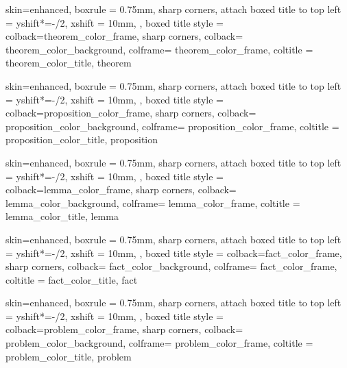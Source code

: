 
{
  skin=enhanced,
  boxrule = 0.75mm,
  sharp corners,
  attach boxed title to top left = {
      yshift*=-\tcboxedtitleheight/2,
      xshift = 10mm,
    },
  boxed title style = {colback=theorem_color_frame, sharp corners},
  colback= theorem_color_background,
  colframe= theorem_color_frame,
  coltitle = theorem_color_title,
}{theorem}

{
  skin=enhanced,
  boxrule = 0.75mm,
  sharp corners,
  attach boxed title to top left = {
      yshift*=-\tcboxedtitleheight/2,
      xshift = 10mm,
    },
  boxed title style = {colback=proposition_color_frame, sharp corners},
  colback= proposition_color_background,
  colframe= proposition_color_frame,
  coltitle = proposition_color_title,
}{proposition}

{
  skin=enhanced,
  boxrule = 0.75mm,
  sharp corners,
  attach boxed title to top left = {
      yshift*=-\tcboxedtitleheight/2,
      xshift = 10mm,
    },
  boxed title style = {colback=lemma_color_frame, sharp corners},
  colback= lemma_color_background,
  colframe= lemma_color_frame,
  coltitle = lemma_color_title,
}{lemma}


{
  skin=enhanced,
  boxrule = 0.75mm,
  sharp corners,
  attach boxed title to top left = {
      yshift*=-\tcboxedtitleheight/2,
      xshift = 10mm,
    },
  boxed title style = {colback=fact_color_frame, sharp corners},
  colback= fact_color_background,
  colframe= fact_color_frame,
  coltitle = fact_color_title,
}{fact}

{
  skin=enhanced,
  boxrule = 0.75mm,
  sharp corners,
  attach boxed title to top left = {
      yshift*=-\tcboxedtitleheight/2,
      xshift = 10mm,
    },
  boxed title style = {colback=problem_color_frame, sharp corners},
  colback= problem_color_background,
  colframe= problem_color_frame,
  coltitle = problem_color_title,
}{problem}






